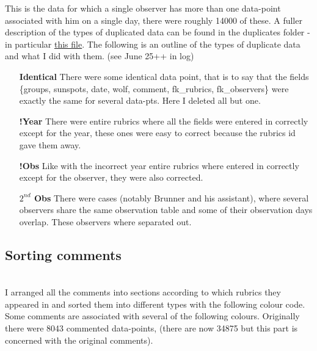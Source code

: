 \documentclass[12pt]{article}
\begin{document}
This is the data for which a single observer has more than one data-point associated with him on a single day, there were roughly 14000 of these. A fuller description of the types of duplicated data can be found in the duplicates folder - in particular \href{https://github.com/dcxSt/DATA_SILSO_HISTO_search/blob/master/duplicates/3\%202019.06.27/corrections_needed_handwritten.md}{this file}. The following is an outline of the types of duplicate data and what I did with them. (see June 25++ in log)

\begin{itemize}
    \item[\textbf{Identical}] There were some identical data point, that is to say that the fields \{groups, sunspots, date, wolf, comment, fk\_rubrics, fk\_observers\} were exactly the same for several data-pts. Here I deleted all but one.
    \item[\textbf{!Year}] There were entire rubrics where all the fields were entered in correctly except for the year, these ones were easy to correct because the rubrics id gave them away.
    \item[\textbf{!Obs}] Like with the incorrect year entire rubrics where entered in correctly except for the observer, they were also corrected.
    \item[\textbf{$2^{nd}$ Obs}] There were cases (notably Brunner and his assistant), where several observers share the same observation table and some of their observation days overlap. These observers where separated out. 
\end{itemize}


\subsection{Sorting comments}\\

I arranged all the comments into sections according to which rubrics they appeared in and sorted them into different types with the following colour code. Some comments are associated with several of the following colours. Originally there were 8043 commented data-points, (there are now 34875 but this part is concerned with the original comments).
\end{document}
